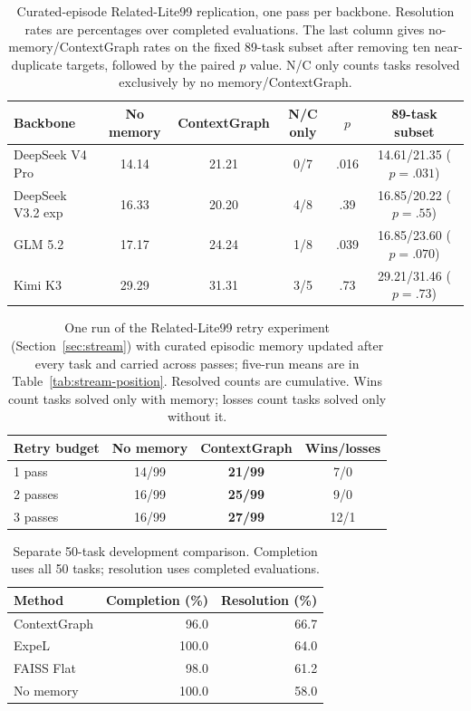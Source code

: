 \begin{table}[htbp]
\centering
\caption{Curated-episode Related-Lite99 replication, one pass per
backbone. Resolution rates are percentages over completed evaluations. The last column gives
no-memory/ContextGraph rates on the fixed 89-task subset after removing ten
near-duplicate targets, followed by the paired $p$ value.
N/C only counts tasks resolved exclusively by no memory/ContextGraph.}
\label{tab:swectx-xmodel}
\small
\begin{tabular}{lccccc}
\toprule
Backbone & No memory & ContextGraph & N/C only & $p$ & 89-task subset \\
\midrule
DeepSeek V4 Pro & 14.14 & 21.21 & 0/7 & .016 & 14.61/21.35 ($p=.031$) \\
DeepSeek V3.2 exp & 16.33 & 20.20 & 4/8 & .39 & 16.85/20.22 ($p=.55$) \\
GLM 5.2 & 17.17 & 24.24 & 1/8 & .039 & 16.85/23.60 ($p=.070$) \\
Kimi K3 & 29.29 & 31.31 & 3/5 & .73 & 29.21/31.46 ($p=.73$) \\
\bottomrule
\end{tabular}
\end{table}

\begin{table}[htbp]
\centering
\caption{One run of the Related-Lite99 retry experiment (Section~\ref{sec:stream})
with curated episodic memory updated after every task and carried across
passes; five-run means are in
Table~\ref{tab:stream-position}.
Resolved counts are cumulative. Wins count tasks solved only with memory;
losses count tasks solved only without it.}
\label{tab:swectx-stream}
\begin{tabular}{lccc}
\toprule
Retry budget & No memory & ContextGraph & Wins/losses \\
\midrule
1 pass & 14/99 & \textbf{21/99} & 7/0 \\
2 passes & 16/99 & \textbf{25/99} & 9/0 \\
3 passes & 16/99 & \textbf{27/99} & 12/1 \\
\bottomrule
\end{tabular}
\end{table}

\begin{table}[htbp]
\centering
\caption{Separate 50-task development comparison.
Completion uses all 50 tasks; resolution uses completed evaluations.}
\label{tab:dev50}
\begin{tabular}{lrr}
\toprule
Method & Completion (\%) & Resolution (\%) \\
\midrule
ContextGraph & 96.0 & 66.7 \\
ExpeL & 100.0 & 64.0 \\
FAISS Flat & 98.0 & 61.2 \\
No memory & 100.0 & 58.0 \\
\bottomrule
\end{tabular}
\end{table}

